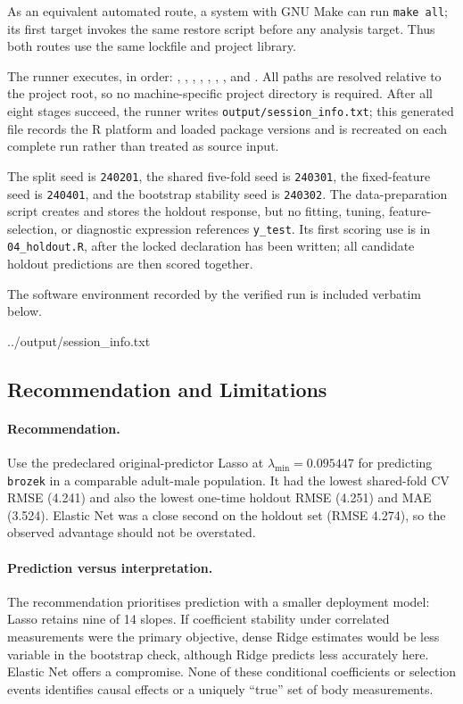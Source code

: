 As an equivalent automated route, a system with GNU Make can run
\texttt{make all}; its first target invokes the same restore script before any
analysis target.  Thus both routes use the same lockfile and project library.

The runner executes, in order:
, ,
, , ,
, , and
.  All paths are resolved relative to the project root,
so no machine-specific project directory is required.  After all eight stages
succeed, the runner writes \texttt{output/session\_info.txt}; this generated
file records the R platform and loaded package versions and is recreated on
each complete run rather than treated as source input.

The split seed is \texttt{240201}, the shared five-fold seed is
\texttt{240301}, the fixed-feature seed is \texttt{240401}, and the bootstrap
stability seed is \texttt{240302}.  The data-preparation script creates and
stores the holdout response, but no fitting, tuning, feature-selection, or
diagnostic expression references \texttt{y\_test}.  Its first scoring use is in
\texttt{04\_holdout.R}, after the locked declaration has been written; all
candidate holdout predictions are then scored together.

The software environment recorded by the verified run is included verbatim
below.


  {../output/session_info.txt}

\subsection{Recommendation and Limitations}
\label{sec:recommendation}

\paragraph{Recommendation.}
Use the predeclared original-predictor Lasso at
$\lambda_{\min}=0.095447$ for predicting \texttt{brozek} in a comparable
adult-male population.  It had the lowest shared-fold CV RMSE (4.241) and also
the lowest one-time holdout RMSE (4.251) and MAE (3.524).  Elastic Net was a
close second on the holdout set (RMSE 4.274), so the observed advantage should
not be overstated.

\paragraph{Prediction versus interpretation.}
The recommendation prioritises prediction with a smaller deployment model:
Lasso retains nine of 14 slopes.  If coefficient stability under correlated
measurements were the primary objective, dense Ridge estimates would be less
variable in the bootstrap check, although Ridge predicts less accurately here.
Elastic Net offers a compromise.  None of these conditional coefficients or
selection events identifies causal effects or a uniquely ``true'' set of body
measurements.

